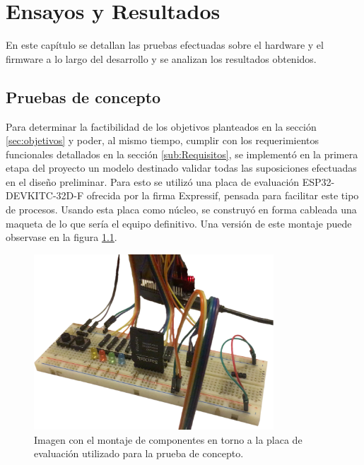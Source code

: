 
\chapter{Ensayos y Resultados} %
\label{Chapter4}

En este capítulo se detallan las pruebas efectuadas sobre el hardware y el firmware a lo largo del desarrollo y se analizan los resultados obtenidos.
 
\section{Pruebas de concepto}
\label{sec:PruebasConcepto}

Para determinar la factibilidad de los objetivos planteados en la sección \ref{sec:objetivos} y poder, al mismo tiempo, cumplir con los requerimientos funcionales detallados en la sección \ref{sub:Requisitos}, se implementó en la primera etapa del proyecto un modelo destinado validar todas las suposiciones efectuadas en el diseño preliminar. Para esto se utilizó una placa de evaluación ESP32-DEVKITC-32D-F\cite{noauthor_esp32-devkitc_nodate} ofrecida por la firma Expressif, pensada para facilitar este tipo de procesos. Usando esta placa como núcleo, se construyó en forma cableada una maqueta de lo que sería el equipo definitivo. Una versión de este montaje puede observase en la figura \ref{fig:Demostrador}.

\begin{figure}[ht]
	\centering
	\includegraphics[width=0.8\textwidth]{Figures/Demostrador.png}
	\caption[Montaje utilizado para las pruebas de concepto]{Imagen con el montaje de componentes en torno a la placa de evaluación utilizado para la prueba de concepto.}
	\label{fig:Demostrador}
\end{figure}


